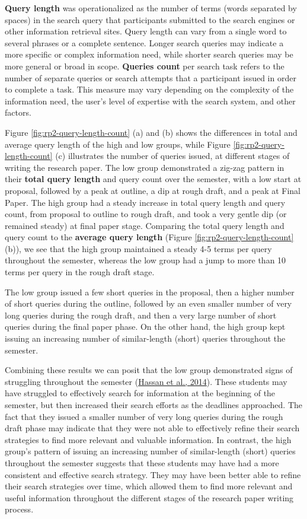 \documentclass[letterpaper, nobind]{templates/ociamthesis}
\begin{document}
\textbf{Query length} was operationalized as the number of terms (words separated by spaces) in the search query that participants submitted to the search engines or other information retrieval sites.
Query length can vary from a single word to several phrases or a complete sentence.
Longer search queries may indicate a more specific or complex information need, while shorter search queries may be more general or broad in scope.
\textbf{Queries count} per search task refers to the number of separate queries or search attempts that a participant issued in order to complete a task.
This measure may vary depending on the complexity of the information need, the user's level of expertise with the search system, and other factors.

Figure \ref{fig:rp2-query-length-count} (a) and (b) shows the differences in total and average query length of the high and low groups, while Figure \ref{fig:rp2-query-length-count} (c) illustrates the number of queries issued, at different stages of writing the research paper. The low group demonstrated a zig-zag pattern in their \textbf{total query length} and query count over the semester, with a low start at proposal, followed by a peak at outline, a dip at rough draft, and a peak at Final Paper.
The high group had a steady increase in total query length and query count, from proposal to outline to rough draft, and took a very gentle dip (or remained steady) at final paper stage.
Comparing the total query length and query count to the \textbf{average query length} (Figure \ref{fig:rp2-query-length-count} (b)), we see that the high group maintained a steady 4-5 terms per query throughout the semester, whereas the low group had a jump to more than 10 terms per query in the rough draft stage.

The low group issued a few short queries in the proposal, then a higher number of short queries during the outline, followed by an even smaller number of very long queries during the rough draft, and then a very large number of short queries during the final paper phase.
On the other hand, the high group kept issuing an increasing number of similar-length (short) queries throughout the semester.

Combining these results we can posit that the low group demonstrated signs of struggling throughout the semester (\protect\hyperlink{ref-hassan2014struggling}{Hassan et al., 2014}).
These students may have struggled to effectively search for information at the beginning of the semester, but then increased their search efforts as the deadlines approached. The fact that they issued a smaller number of very long queries during the rough draft phase may indicate that they were not able to effectively refine their search strategies to find more relevant and valuable information.
In contrast, the high group's pattern of issuing an increasing number of similar-length (short) queries throughout the semester suggests that these students may have had a more consistent and effective search strategy. They may have been better able to refine their search strategies over time, which allowed them to find more relevant and useful information throughout the different stages of the research paper writing process.
\end{document}
